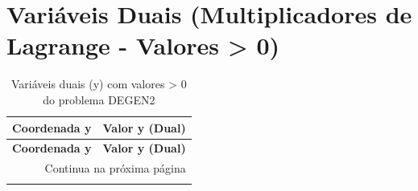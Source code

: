 \documentclass[12pt]{article}
\begin{document}
\section{Variáveis Duais (Multiplicadores de Lagrange - Valores > 0)}

\begin{longtable}{@{}cc@{}}
\caption{Variáveis duais (y) com valores > 0 do problema DEGEN2} \\
\toprule
\textbf{Coordenada y} & \textbf{Valor y (Dual)} \\
\midrule
\endfirsthead

\toprule
\textbf{Coordenada y} & \textbf{Valor y (Dual)} \\
\midrule
\endhead

\midrule \multicolumn{2}{r}{{Continua na próxima página}} \\ \midrule
\endfoot


\end{longtable}
\end{document}
